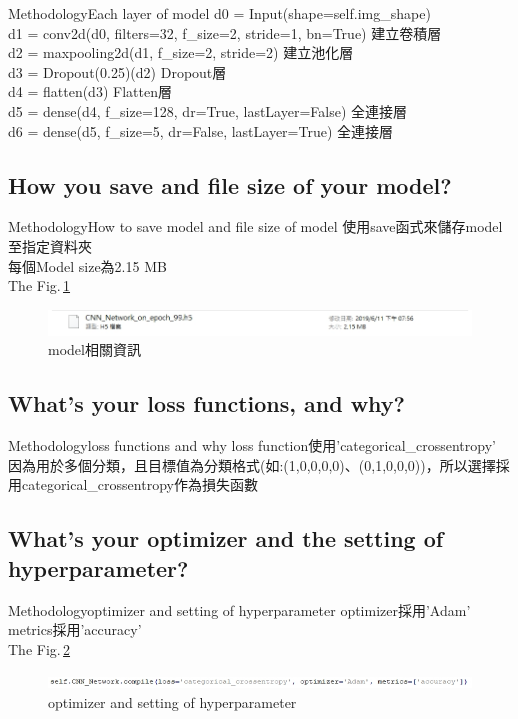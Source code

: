 \documentclass{beamer}
\begin{document}
\begin{CJK}{UTF8}{nkai}
\begin{frame}{Methodology}{Each layer of model}
d0 = Input(shape=self.img\_shape)\\
 d1 = conv2d(d0, filters=32, f\_size=2, stride=1, bn=True) 建立卷積層\\
 d2 = maxpooling2d(d1, f\_size=2, stride=2) 建立池化層\\
 d3 = Dropout(0.25)(d2) Dropout層\\
d4 = flatten(d3)  Flatten層\\
d5 = dense(d4, f\_size=128, dr=True, lastLayer=False) 全連接層\\
 d6 = dense(d5, f\_size=5, dr=False, lastLayer=True) 全連接層\\

\end{frame}

\subsection{How you save and file size of your model?}

\subsection{What's your loss functions, and why?}
\begin{frame}{Methodology}{loss functions and why}
	loss function使用'categorical\_crossentropy'\\
	因為用於多個分類，且目標值為分類格式(如:(1,0,0,0,0)、(0,1,0,0,0))，所以選擇採用categorical\_crossentropy作為損失函數
\end{frame}
\subsection{What's your optimizer and the setting of hyperparameter?}

\end{CJK}
\end{document}
